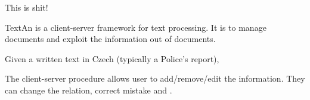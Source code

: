 This is shit!

TextAn is a client-server framework for text processing. It is to manage documents and exploit the information out of documents.


Given a written text in Czech (typically a Police's report), 

The client-server procedure allows user to add/remove/edit the information. They can change the relation, correct mistake and .


